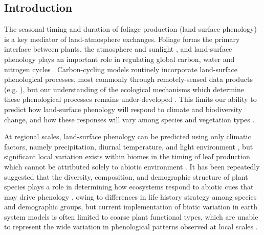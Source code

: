 \begin{refsection}
\section{Introduction}
\label{phen:sec:intro}

The seasonal timing and duration of foliage production (land-surface phenology) is a key mediator of land-atmosphere exchanges. Foliage forms the primary interface between plants, the atmosphere and sunlight \citep{Gu2003, Penuelas2009}, and land-surface phenology plays an important role in regulating global carbon, water and nitrogen cycles \citep{Richardson2013}. Carbon-cycling models routinely incorporate land-surface phenological processes, most commonly through remotely-sensed data products (e.g. \citealt{Bloom2016}), but our understanding of the ecological mechanisms which determine these phenological processes remains under-developed \citep{Whitley2017}. This limits our ability to predict how land-surface phenology will respond to climate and biodiversity change, and how these responses will vary among species and vegetation types \citep{Xia2015}.

At regional scales, land-surface phenology can be predicted using only climatic factors, namely precipitation, diurnal temperature, and light environment \citep{Adole2018a}, but significant local variation exists within biomes in the timing of leaf production which cannot be attributed solely to abiotic environment \citep{Stockli2011}. It has been repeatedly suggested that the diversity, composition, and demographic structure of plant species plays a role in determining how ecosystems respond to abiotic cues that may drive phenology \citep{Adole2018b, Jeganathan2014, Fuller1999}, owing to differences in life history strategy among species and demographic groups, but current implementation of biotic variation in earth system models is often limited to coarse plant functional types, which are unable to represent the wide variation in phenological patterns observed at local scales \citep{Scheiter2013, Pavlick2013}.


\end{refsection}
